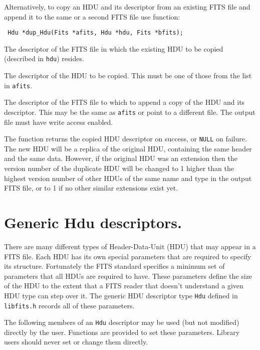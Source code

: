 Alternatively, to copy an HDU and its descriptor from an existing FITS
file and append it to the same or a second FITS file use function:
\label{dup_Hdu}\begin{verbatim}
 Hdu *dup_Hdu(Fits *afits, Hdu *hdu, Fits *bfits);
\end{verbatim}
\begin{arglist}

  The descriptor of the FITS file in which the
          existing HDU to be copied (described in \verb`hdu`) resides.

  The descriptor of the HDU to be copied. This must be one of
          those from the list in \verb`afits`.

  The descriptor of the FITS file to which to
          append a copy of the HDU and its descriptor. This may be the
          same as \verb`afits` or point to a different file. The
          output file must have write access enabled.
\end{arglist}

The function returns the copied HDU descriptor on success, or \verb`NULL` on
failure. The new HDU will be a replica of the original HDU, containing
the same header and the same data. However, if the original HDU was an
extension then the version number of the duplicate HDU will be changed
to 1 higher than the highest version number of other HDUs of the same
name and type in the output FITS file, or to 1 if no other similar
extensions exist yet.

\section{Generic Hdu descriptors.}

There are many different types of Header-Data-Unit (HDU) that may
appear in a FITS file. Each HDU has its own special
parameters that are required to specify its structure. Fortunately the
FITS standard specifies a minimum set of parameters that all HDUs are
required to have. These parameters define the size of the HDU to the extent
that a FITS reader that doesn't understand a given HDU type can step
over it. The generic HDU descriptor type \verb`Hdu` defined in
\verb`libfits.h` records all of these parameters.

The following members of an \verb`Hdu` descriptor may be used (but
not modified) directly by the user. Functions are provided to set
these parameters. Library users should never set or change them
directly.


